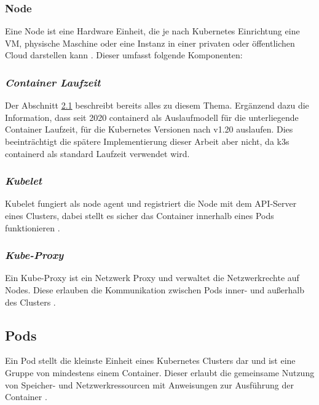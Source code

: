 \subsubsection{Node}
Eine Node ist eine Hardware Einheit, die je nach Kubernetes Einrichtung eine
VM, physische Maschine oder eine Instanz in einer privaten oder öffentlichen Cloud darstellen kann \cite{kubernetesnodes}.
Dieser umfasst folgende Komponenten:

\subsubsection{\textit{Container Laufzeit}}
Der Abschnitt \hyperref[Docker]{2.1} beschreibt bereits alles zu diesem Thema.
Ergänzend dazu die Information, dass seit 2020 containerd als Auslaufmodell für die unterliegende Container Laufzeit, 
für die Kubernetes Versionen nach v1.20 auslaufen. Dies beeinträchtigt die spätere Implementierung dieser Arbeit aber nicht,
da k3s containerd als standard Laufzeit verwendet wird.

\subsubsection{\textit{Kubelet}}
Kubelet fungiert als \glqq node agent\grqq{} und registriert die Node mit dem
API-Server eines Clusters, dabei stellt es sicher das Container innerhalb eines Pods
funktionieren \cite{kubernetesnodes}.

\subsubsection{\textit{Kube-Proxy}}
Ein Kube-Proxy ist ein Netzwerk Proxy und verwaltet die Netzwerkrechte auf Nodes.
Diese erlauben die Kommunikation zwischen Pods inner- und außerhalb des Clusters \cite{kubernetesnodes}.

\subsection{Pods}
Ein Pod stellt die kleinste Einheit eines Kubernetes Clusters dar und ist eine Gruppe von mindestens einem Container.
Dieser erlaubt die gemeinsame Nutzung von Speicher- und Netzwerkressourcen mit Anweisungen zur Ausführung der Container \cite{kubernetespods}.


